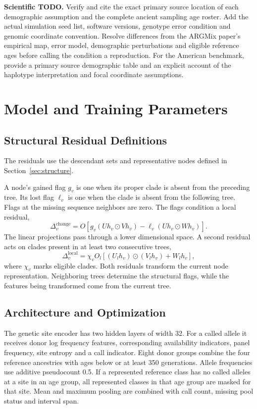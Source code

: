 \documentclass[letterpaper]{article}
\newcommand{\todo}[1]{\par\noindent\textbf{Scientific TODO.} #1\par}
\begin{document}
\todo{Verify and cite the exact primary source location of each demographic assumption and the complete ancient sampling age roster. Add the actual simulation seed list, software versions, genotype error condition and genomic coordinate convention. Resolve differences from the ARGMix paper's empirical map, error model, demographic perturbations and eligible reference ages before calling the condition a reproduction. For the American benchmark, provide a primary source demographic table and an explicit account of the haplotype interpretation and focal coordinate assumptions.}

\section{Model and Training Parameters}
\label{app:training}

\subsection{Structural Residual Definitions}
The residuals use the descendant sets and representative nodes defined in Section~\ref{sec:structure}.

A node's gained flag $g_v$ is one when its proper clade is absent from the preceding tree. Its lost flag $\ell_v$ is one when the clade is absent from the following tree. Flags at the missing sequence neighbors are zero. The flags condition a local residual,
\begin{equation}
\Delta_v^{\mathrm{change}}=
O\!\left[
g_v(Uh_v\odot Vh_v)
-\ell_v(Uh_v\odot Wh_v)
\right].
\label{eq:change}
\end{equation}
The linear projections pass through a lower dimensional space. A second residual acts on clades present in at least two consecutive trees,
\begin{equation}
\Delta_v^{\mathrm{local}}=
\chi_v O_l\!\left[(U_lh_v)\odot(V_lh_v)+W_lh_v\right],
\label{eq:local}
\end{equation}
where $\chi_v$ marks eligible clades. Both residuals transform the current node representation. Neighboring trees determine the structural flags, while the features being transformed come from the current tree.

\subsection{Architecture and Optimization}
The genetic site encoder has two hidden layers of width 32. For a called allele it receives donor log frequency features, corresponding availability indicators, panel frequency, site entropy and a call indicator. Eight donor groups combine the four reference ancestries with ages below or at least 350 generations. Allele frequencies use additive pseudocount 0.5. If a represented reference class has no called alleles at a site in an age group, all represented classes in that age group are masked for that site. Mean and maximum pooling are combined with call count, missing pool status and interval span.
\end{document}
